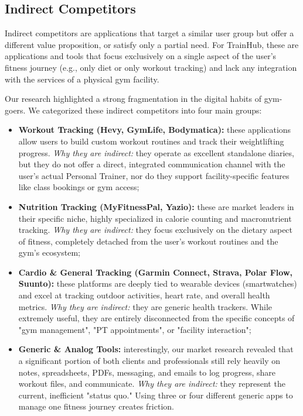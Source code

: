\subsection{Indirect Competitors}\label{subsect:IndirectCompetitors}
Indirect competitors are applications that target a similar user group but offer a different value proposition, or satisfy only a partial need. For TrainHub, these are applications and tools that focus exclusively on a single aspect of the user's fitness journey (e.g., only diet or only workout tracking) and lack any integration with the services of a physical gym facility.

Our research highlighted a strong fragmentation in the digital habits of gym-goers. We categorized these indirect competitors into four main groups:

\begin{itemize}
    \item \textbf{Workout Tracking (Hevy, GymLife, Bodymatica):}
    these applications allow users to build custom workout routines and track their weightlifting progress.
    \textit{Why they are indirect:} they operate as excellent standalone diaries, but they do not offer a direct, integrated communication channel with the user's actual Personal Trainer, nor do they support facility-specific features like class bookings or gym access;

    \item \textbf{Nutrition Tracking (MyFitnessPal, Yazio):}
    these are market leaders in their specific niche, highly specialized in calorie counting and macronutrient tracking.
    \textit{Why they are indirect:} they focus exclusively on the dietary aspect of fitness, completely detached from the user's workout routines and the gym's ecosystem;

    \item \textbf{Cardio \& General Tracking (Garmin Connect, Strava, Polar Flow, Suunto):}
    these platforms are deeply tied to wearable devices (smartwatches) and excel at tracking outdoor activities, heart rate, and overall health metrics.
    \textit{Why they are indirect:} they are generic health trackers. While extremely useful, they are entirely disconnected from the specific concepts of "gym management", "PT appointments", or "facility interaction";

    \item \textbf{Generic \& Analog Tools:}
    interestingly, our market research revealed that a significant portion of both clients and professionals still rely heavily on notes, spreadsheets, PDFs, messaging, and emails to log progress, share workout files, and communicate.
    \textit{Why they are indirect:} they represent the current, inefficient "status quo." Using three or four different generic apps to manage one fitness journey creates friction.
\end{itemize}

